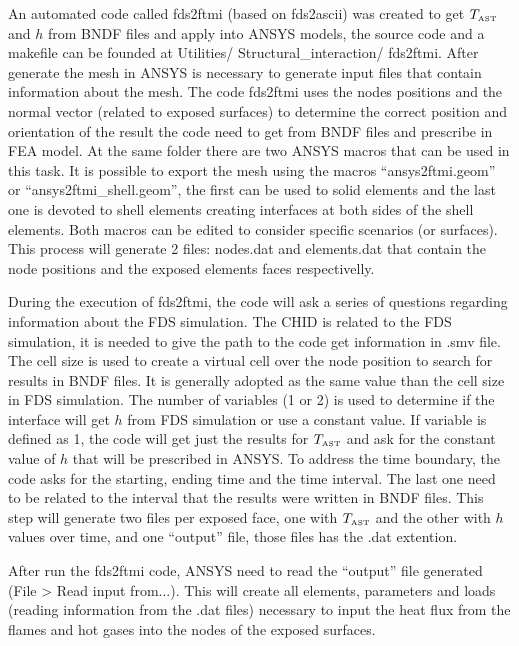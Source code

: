 \documentclass[12pt]{article}
\begin{document}
An automated code called fds2ftmi (based on fds2ascii) was created to get $T_{\hbox{\tiny AST}}$ and $h$ from {\ct BNDF} files and apply into A{\footnotesize NSYS} models, the source code and a makefile can be founded at Utilities/ Structural\_interaction/ fds2ftmi.
After generate the mesh in A{\footnotesize NSYS} is necessary to generate input files that contain information about the mesh. 
The code fds2ftmi uses the nodes positions and the normal vector (related to exposed surfaces) to determine the correct position and orientation of the result the code need to get from {\ct BNDF} files and prescribe in FEA model.
At the same folder there are two A{\footnotesize NSYS} macros that can be used in this task.
It is possible to export the mesh using the macros ``ansys2ftmi.geom'' or ``ansys2ftmi\_shell.geom'', the first can be used to solid elements and the last one is devoted to shell elements creating interfaces at both sides of the shell elements.
Both macros can be edited to consider specific scenarios (or surfaces). This process will generate 2 files: nodes.dat and elements.dat that contain the node positions and the exposed elements faces respectivelly.  

During the execution of fds2ftmi, the code will ask a series of questions regarding information about the FDS simulation. 
The {\ct CHID} is related to the FDS simulation, it is needed to give the path to the code get information in .smv file.
The cell size is used to create a virtual cell over the node position to search for results in {\ct BNDF} files. It is generally adopted as the same value than the cell size in FDS simulation.
The number of variables (1 or 2) is used to determine if the interface will get $h$ from FDS simulation or use a constant value. 
If variable is defined as 1, the code will get just the results for $T_{\hbox{\tiny AST}}$ and ask for the constant value of $h$ that will be prescribed in A{\footnotesize NSYS}.
To address the time boundary, the code asks for the starting, ending time and the time interval. The last one need to be related to the interval that the results were written in {\ct BNDF} files.
This step will generate two files per exposed face, one with $T_{\hbox{\tiny AST}}$ and the other with $h$ values over time, and one ``output'' file, those files has the .dat extention.

After run the fds2ftmi code, A{\footnotesize NSYS} need to read the ``output'' file generated (File > Read input from...).
This will create all elements, parameters and loads (reading information from the .dat files) necessary to input the heat flux from the flames and hot gases into the nodes of the exposed surfaces.
\end{document}
